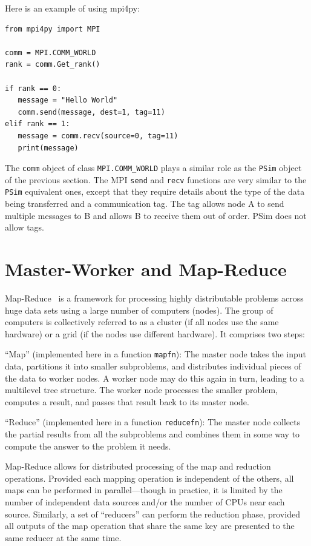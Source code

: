 \documentclass[justified, sixbynine]{tufte-book}
\def\ft{\small\tt}
\theoremstyle{plain}%
\newtheorem * {corollary}{Corollary}
\theoremstyle{definition}
\theoremstyle{remark}
\newtheorem * {remark}{Remark}
\newtheorem * {note}{Note}
\begin{document}
\begin{fullwidth}
Here is an example of using mpi4py:

\begin{lstlisting}
from mpi4py import MPI

comm = MPI.COMM_WORLD
rank = comm.Get_rank()

if rank == 0:
   message = "Hello World"
   comm.send(message, dest=1, tag=11)
elif rank == 1:
   message = comm.recv(source=0, tag=11)
   print(message)
\end{lstlisting}

The {\ft comm} object of class {\ft MPI.COMM\_WORLD} plays a similar role as the {\ft PSim} object of the previous section. The MPI {\ft send} and {\ft recv} functions are very similar to the {\ft PSim} equivalent ones, except that they require details about the type of the data being transferred and a communication tag. The tag allows node A to send multiple messages to B and allows B to receive them out of order. PSim does not allow tags.

\goodbreak\section{Master-Worker and Map-Reduce}

Map-Reduce~\cite{mapreduce} is a framework for processing highly distributable problems across huge data sets using a large number of computers (nodes). The group of computers is collectively referred to as a cluster (if all nodes use the same hardware) or a grid (if the nodes use different hardware). It comprises two steps:

``Map'' (implemented here in a function {\ft mapfn}): The master node takes the input data, partitions it into smaller subproblems, and distributes individual pieces of the data to worker nodes. A worker node may do this again in turn, leading to a multilevel tree structure. The worker node processes the smaller problem, computes a result, and passes that result back to its master node.

``Reduce'' (implemented here in a function {\ft reducefn}): The master node collects the partial results from all the subproblems and combines them in some way to compute the answer to the problem it needs.

Map-Reduce allows for distributed processing of the map and reduction operations. Provided each mapping operation is independent of the others, all maps can be performed in parallel---though in practice, it is limited by the number of independent data sources and/or the number of CPUs near each source. Similarly, a set of ``reducers'' can perform the reduction phase, provided all outputs of the map operation that share the same key are presented to the same reducer at the same time.


\end{fullwidth}
\end{document}
